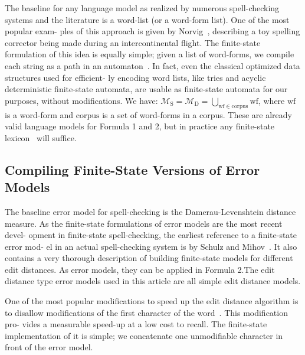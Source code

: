 \documentclass[postprint]{flammie}
\begin{document}
The baseline for any language model as realized by numerous spell-checking
systems and the literature is a word-list (or a word-form list). One of the
most popular exam- ples of this approach is given by Norvig~\cite{norvig},
describing a toy spelling corrector being made during an intercontinental
flight. The finite-state formulation of this idea is equally simple; given a
list of word-forms, we compile each string as a path in an
automaton~\cite{pirinen2012effects}. In fact, even the classical optimized data
structures used for efficient- ly encoding word lists, like tries and acyclic
deterministic finite-state automata, are usable as finite-state automata for
our purposes, without modifications. We have:
   $\mathcal{M}_\mathrm{S} = \mathcal{M}_\mathrm{D} = \bigcup_{\mathrm{wf} \in \mathrm{corpus}} \mathrm{wf}$, where $\mathrm{wf}$ is a word-form and $\mathrm{corpus}$ is a
set of word-forms in a corpus. These are already valid language models for
Formula 1 and 2, but in practice any finite-state
lexicon~\cite{beesley2003finite} will suffice.

\subsection{Compiling Finite-State Versions of Error Models}

The baseline error model for spell-checking is the Damerau-Levenshtein distance
measure. As the finite-state formulations of error models are the most recent
devel- opment in finite-state spell-checking, the earliest reference to a
finite-state error mod- el in an actual spell-checking system is by Schulz and
Mihov~\cite{schulz2002fast}. It also contains a very thorough description of
building finite-state models for different edit distances.  As error models,
they can be applied in Formula 2.The edit distance type error models used in
this article are all simple edit distance models.

One of the most popular modifications to speed up the edit distance algorithm
is to disallow modifications of the first character of the
word~\cite{bhagat2007spelling}. This modification pro- vides a measurable
speed-up at a low cost to recall. The finite-state implementation of it is
simple; we concatenate one unmodifiable character in front of the error model.
\end{document}
